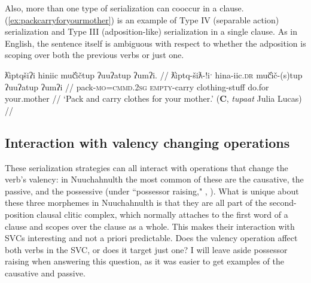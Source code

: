 \begin{comment}
Something similar happened with Sophie Billy. Sentence () is from a translation text she has been working on, and I asked about rephrases () and (). While I was interpreting () as manner and action (Type I), I think she, in the context of the story, saw them as sequential (Type V): lead and then bring back. In this context, the reordering of () is nonsense: One cannot bring someone back and then lead them.

\ex \label{ex:leadbringback}
\begingl
\glpreamble m̓aw̓aaƛint ḥaaw̓iłƛisi huʔacap̓ƛ. //
\gla m̓aw̓aa=!aƛ=int ḥaaw̓iłƛ=ʔis=ʔiˑ huʔa-ci-!ap=!aƛ //
\glb lead=\textsc{now}=\textsc{pst} young.man=\textsc{dim}=\textsc{art} back-go=\textsc{caus}\textsc{now} //
\glft `She led the young man and took him back.' (\textbf{Q}, Sophie Billy) //
\endgl
\xe

NB: This is due to obj-verb ordering of ex. 3
BM
yaacukw̓it̓asaḥ waałak c̓uumaʕas
*yaacukw̓it̓asaḥ c̓uumaʕas
*yaacukw̓it̓asaḥ c̓uumaʕas waałak


NB: This may be due to the !aƛ forcing a two-sentence interpretation
SB
m̓aw̓aaƛint ḥaaw̓iłƛisi huʔacap̓ƛ
m̓aw̓aaƛint huʔacap̓ƛ ḥaaw̓iłƛisi
*huʔacap̓ƛint m̓aw̓aaƛ ḥaaw̓iłƛisi 
\end{comment}

Also, more than one type of serialization can cooccur in a clause. (\ref{ex:packcarryforyourmother}) is an example of Type IV (separable action) serialization and Type III (adposition-like) serialization in a single clause. As in English, the sentence itself is ambiguous with respect to whether the adposition is scoping over both the previous verbs or just one.

\ex \label{ex:packcarryforyourmother}
\begingl
\glpreamble ƛ̓iptqšiʔi hiniic muč̓ičtup ʔuuʔatup ʔumʔi. //
\gla ƛ̓iptq-šiƛ-!iˑ hina-iic.\textsc{dr} muč̓ič-(s)tup ʔuuʔatup ʔumʔi //
\glb pack-\textsc{mo}=\textsc{cmmd.2sg} \textsc{empty}-carry clothing-stuff do.for your.mother //
\glft `Pack and carry clothes for your mother.' (\textbf{C}, \textit{tupaat} Julia Lucas) //
\endgl
\xe

\subsection{Interaction with valency changing operations} \label{ch:sv:valence}

These serialization strategies can all interact with operations that change the verb's valency: in Nuuchahnulth the most common of these are the causative, the passive, and the possessive (under ``possessor raising," \citealt[p.~307--309]{davidson2002}, \citealt{braithwaite2003}). What is unique about these three morphemes in Nuuchahnulth is that they are all part of the second-position clausal clitic complex, which normally attaches to the first word of a clause and scopes over the clause as a whole. This makes their interaction with SVCs interesting and not a priori predictable. Does the valency operation affect both verbs in the SVC, or does it target just one? I will leave aside possessor raising when answering this question, as it was easier to get examples of the causative and passive.

